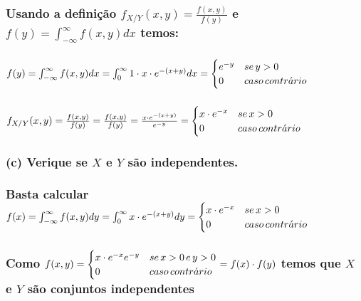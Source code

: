 \documentclass[english]{article}
\begin{document}
\subsubsection*{\textmd{Usando a definição $f_{X/Y}(x,y)=\frac{f(x,y)}{f(y)}$ e
$f(y)=\int_{-\infty}^{\infty}f(x,y)dx$ temos:}}


\subsubsection*{\textmd{$f(y)=\int_{-\infty}^{\infty}f(x,y)dx=\int_{0}^{\infty}1\cdot x\cdot e^{-(x+y)}dx=\protect\begin{cases}
e^{-y} & se\, y>0\protect\\
0 & caso\, contr\acute{a}rio
\protect\end{cases}$}}


\subsubsection*{$f_{X/Y}(x,y)=\frac{f(x,y)}{f(y)}=\frac{f(x,y)}{f(y)}=\frac{x\cdot e^{-(x+y)}}{e^{-y}}=\protect\begin{cases}
x\cdot e^{-x} & se\, x>0\protect\\
0 & caso\, contr\acute{a}rio
\protect\end{cases}$}


\subsubsection*{\textmd{(c) Verique se $X$ e $Y$ são independentes.}}


\subsubsection*{\textmd{Basta calcular $f(x)=\int_{-\infty}^{\infty}f(x,y)dy=\int_{0}^{\infty}x\cdot e^{-(x+y)}dy=\protect\begin{cases}
x\cdot e^{-x} & se\, x>0\protect\\
0 & caso\, contr\acute{a}rio
\protect\end{cases}$}}


\subsubsection*{\textmd{Como $f(x,y)=\protect\begin{cases}
x\cdot e^{-x}e^{-y} & se\, x>0\, e\, y>0\protect\\
0 & caso\, contr\acute{a}rio
\protect\end{cases}=f(x)\cdot f(y)$ temos que $X$ e $Y$ são conjuntos independentes}}
\end{document}
